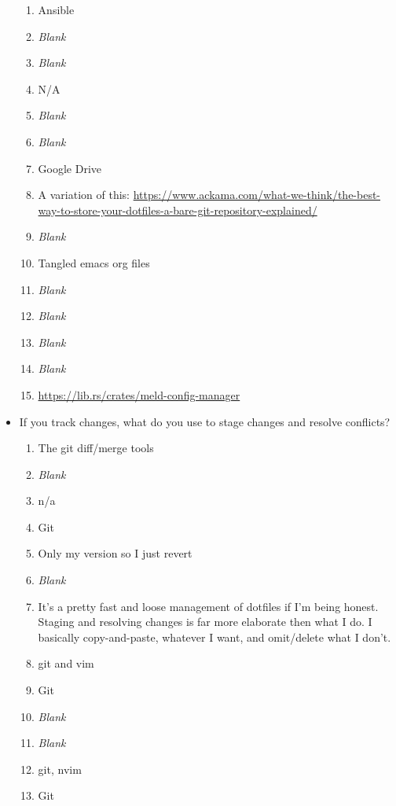 \documentclass[letterpaper]{jdf}
\begin{document}
\begin{itemize}
\begin{enumerate}
        \item Ansible
        \item \emph{Blank}
        \item \emph{Blank}
        \item N/A
        \item \emph{Blank}
        \item \emph{Blank}
        \item Google Drive
        \item A variation of this: \href{https://www.ackama.com/what-we-think/the-best-way-to-store-your-dotfiles-a-bare-git-repository-explained/}{https://www.ackama.com/what-we-think/the-best-way-to-store-your-dotfiles-a-bare-git-repository-explained/}
        \item \emph{Blank}
        \item Tangled emacs org files
        \item \emph{Blank}
        \item \emph{Blank}
        \item \emph{Blank}
        \item \emph{Blank}
        \item \href{https://lib.rs/crates/meld-config-manager}{https://lib.rs/crates/meld-config-manager}
    \end{enumerate}
    \item If you track changes, what do you use to stage changes and resolve conflicts?
    \begin{enumerate}
        \item The git diff/merge tools
        \item \emph{Blank}
        \item n/a
        \item Git
        \item Only my version so I just revert
        \item \emph{Blank}
        \item It's a pretty fast and loose management of dotfiles if I'm being honest. Staging and resolving changes is far more elaborate then what I do. I basically copy-and-paste, whatever I want, and omit/delete what I don't.
        \item git and vim
        \item Git
        \item \emph{Blank}
        \item \emph{Blank}
        \item git, nvim
        \item Git

\end{enumerate}
\end{itemize}
\end{document}
